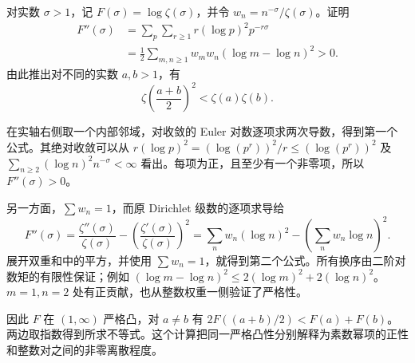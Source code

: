 \begin{exercise}\label{b3:ex:26-6}
对实数 \(\sigma>1\)，记 \(F(\sigma)=\log\zeta(\sigma)\)，并令
\(w_n=n^{-\sigma}/\zeta(\sigma)\)。证明
\[
 \begin{aligned}
 F''(\sigma)&=\sum_p\sum_{r\ge1}
                 r(\log p)^2p^{-r\sigma}\\
 &=\frac12\sum_{m,n\ge1}w_mw_n(\log m-\log n)^2>0.
 \end{aligned}
\]
由此推出对不同的实数 \(a,b>1\)，有
\[
 \zeta\left(\frac{a+b}{2}\right)^2<\zeta(a)\zeta(b).
\]
\end{exercise}
\begin{solution}
在实轴右侧取一个内部邻域，对收敛的 Euler 对数逐项求两次导数，得到第一个公式。其绝对收敛可以从
\(r(\log p)^2=(\log(p^r))^2/r\le(\log(p^r))^2\)
及 \(\sum_{n\ge2}(\log n)^2n^{-\sigma}<\infty\) 看出。每项为正，且至少有一个非零项，所以 \(F''(\sigma)>0\)。

另一方面，\(\sum w_n=1\)，而原 Dirichlet 级数的逐项求导给
\[
 F''(\sigma)
 =\frac{\zeta''(\sigma)}{\zeta(\sigma)}
  -\left(\frac{\zeta'(\sigma)}{\zeta(\sigma)}\right)^2
 =\sum_n w_n(\log n)^2
  -\left(\sum_n w_n\log n\right)^2.
\]
展开双重和中的平方，并使用 \(\sum w_n=1\)，就得到第二个公式。所有换序由二阶对数矩的有限性保证；例如
\((\log m-\log n)^2\le2(\log m)^2+2(\log n)^2\)。
\(m=1,n=2\) 处有正贡献，也从整数权重一侧验证了严格性。

因此 \(F\) 在 \((1,\infty)\) 严格凸，对 \(a\ne b\) 有
\(2F((a+b)/2)<F(a)+F(b)\)。两边取指数得到所求不等式。这个计算把同一严格凸性分别解释为素数幂项的正性和整数对之间的非零离散程度。
\end{solution}

